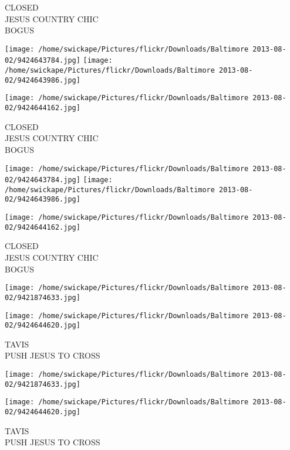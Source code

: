 \documentclass[10pt,letterpaper]{article}
\begin{document}
CLOSED\\
JESUS COUNTRY CHIC\\
BOGUS\\
\pagebreak

\texttt{[image: /home/swickape/Pictures/flickr/Downloads/Baltimore 2013-08-02/9424643784.jpg]}
\texttt{[image: /home/swickape/Pictures/flickr/Downloads/Baltimore 2013-08-02/9424643986.jpg]}

\vspace{0.25in}
\texttt{[image: /home/swickape/Pictures/flickr/Downloads/Baltimore 2013-08-02/9424644162.jpg]}

CLOSED\\
JESUS COUNTRY CHIC\\
BOGUS\\
\pagebreak

\texttt{[image: /home/swickape/Pictures/flickr/Downloads/Baltimore 2013-08-02/9424643784.jpg]}
\texttt{[image: /home/swickape/Pictures/flickr/Downloads/Baltimore 2013-08-02/9424643986.jpg]}

\vspace{0.25in}
\texttt{[image: /home/swickape/Pictures/flickr/Downloads/Baltimore 2013-08-02/9424644162.jpg]}

CLOSED\\
JESUS COUNTRY CHIC\\
BOGUS\\
\pagebreak

\texttt{[image: /home/swickape/Pictures/flickr/Downloads/Baltimore 2013-08-02/9421874633.jpg]}

\vspace{0.25in}
\texttt{[image: /home/swickape/Pictures/flickr/Downloads/Baltimore 2013-08-02/9424644620.jpg]}

TAVIS\\
PUSH JESUS TO CROSS\\
\pagebreak

\texttt{[image: /home/swickape/Pictures/flickr/Downloads/Baltimore 2013-08-02/9421874633.jpg]}

\vspace{0.25in}
\texttt{[image: /home/swickape/Pictures/flickr/Downloads/Baltimore 2013-08-02/9424644620.jpg]}

TAVIS\\
PUSH JESUS TO CROSS\\
\pagebreak
\end{document}
